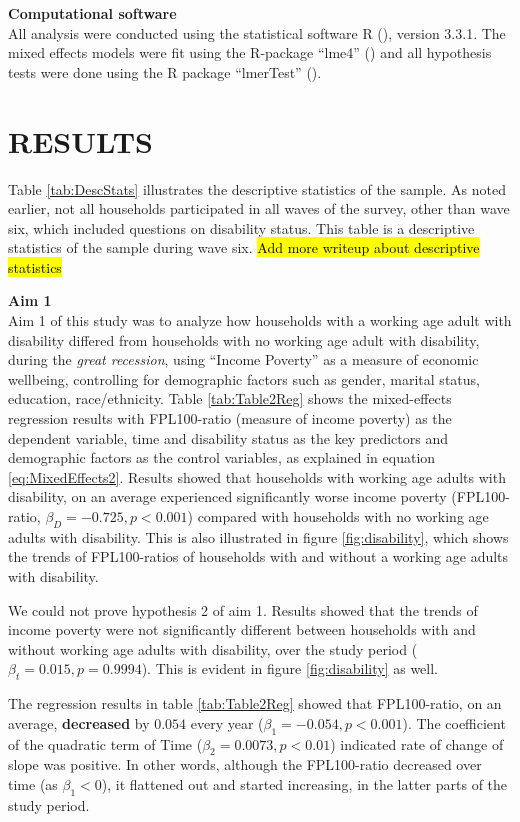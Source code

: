 \documentclass[11pt]{extarticle} %
\begin{document}
\noindent
{\bf{Computational software}}\\
All analysis were conducted using the statistical software R (\cite{R}), version 3.3.1. The mixed effects models were fit using the R-package ``lme4'' (\cite{R-lme4}) and all hypothesis tests were done using the R package ``lmerTest'' (\cite{Kuznetsova_etal_2015_R-lmerTest}). 

\section*{RESULTS}
Table \ref{tab:DescStats} illustrates the descriptive statistics of the sample. As noted earlier, not all households participated in all waves of the survey, other than wave six, which included questions on disability status. This table is a descriptive statistics of the sample during wave six. {\hl{Add more writeup about descriptive statistics}}

\noindent
{\bf{Aim 1}}\\
Aim 1 of this study was to analyze how households with a working age adult with disability differed from households with no working age adult with disability, during the {\emph{great recession}}, using ``Income Poverty'' as a measure of economic wellbeing, controlling for demographic factors such as gender, marital status, education, race/ethnicity. Table \ref{tab:Table2Reg} shows the mixed-effects regression results with FPL100-ratio (measure of income poverty) as the dependent variable, time and disability status as the key predictors and demographic factors as the control variables, as explained in equation \ref{eq:MixedEffects2}. Results showed that households with working age adults with disability, on an average experienced significantly worse income poverty (FPL100-ratio, $\beta_D = -0.725, p < 0.001$) compared with households with no working age adults with disability. This is also illustrated in figure \ref{fig:disability}, which shows the trends of FPL100-ratios of households with and without a working age adults with disability. 

We could not prove hypothesis 2 of aim 1. Results showed that the trends of income poverty were not significantly different between households with and without working age adults with disability, over the study period ($\beta_t = 0.015, p = 0.9994$). This is evident in figure \ref{fig:disability} as well. 

The regression results in table \ref{tab:Table2Reg} showed that FPL100-ratio, on an average, {\bf{decreased}} by $0.054$ every year ($\beta_1 = -0.054, p < 0.001$). The coefficient of the quadratic term of Time ($\beta_2 = 0.0073, p < 0.01$) indicated rate of change of slope was positive. In other words, although the FPL100-ratio decreased over time (as $\beta_1 < 0$), it flattened out and started increasing, in the latter parts of the study period. 
\end{document}

